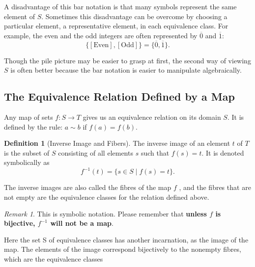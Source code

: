 \documentclass[
]{book}
\theoremstyle{definition}
\newtheorem{definition}{Definition}[chapter]
\theoremstyle{definition}
\theoremstyle{definition}
\theoremstyle{definition}
\theoremstyle{remark}
\newtheorem*{remark}{Remark}
\begin{document}
A disadvantage of this bar notation is that many symbols represent the same element of \(S\). Sometimes this disadvantage can be overcome by choosing a particular element, a representative element, in each equivalence class. For example, the even and the odd integers are often represented by \(\overline{0}\) and \(\overline{1}\):
\begin{equation}
\{[\text{Even}], [\text{Odd}]\} = \{ \overline{0}, \overline{1}\}.
\end{equation}

Though the pile picture may be easier to grasp at first, the second way of viewing \(S\) is often better because the bar notation is easier to manipulate algebraically.

\hypertarget{the-equivalence-relation-defined-by-a-map}{%
\subsection{The Equivalence Relation Defined by a Map}\label{the-equivalence-relation-defined-by-a-map}}

Any map of sets \(f : S \to T\) gives us an equivalence relation on its domain \(S\). It is defined by the rule: \(a \sim b\) if \(f(a) = f(b)\).

\begin{definition}[Inverse Image  and Fibers]
\protect\hypertarget{def:unnamed-chunk-37}{}\label{def:unnamed-chunk-37}The inverse image of an element \(t\) of \(T\) is the subset of \(S\) consisting of all elements \(s\) such that \(f(s) = t\). It is denoted symbolically as
\begin{equation}
f^{-1}(t) = \{s \in S \mid f(s) = t\}.
\end{equation}

The inverse images are also called the fibres of the map \(f\) , and the fibres that are not empty are the equivalence classes for the relation defined above.
\end{definition}

\begin{remark}
This is symbolic notation. Please remember that \textbf{unless \(f\) is bijective, \(f^{-1}\) will not be a map}.
\end{remark}

Here the set S of equivalence classes has another incarnation, as the image of the map.
The elements of the image correspond bijectively to the nonempty fibres, which are the
equivalence classes
\end{document}
